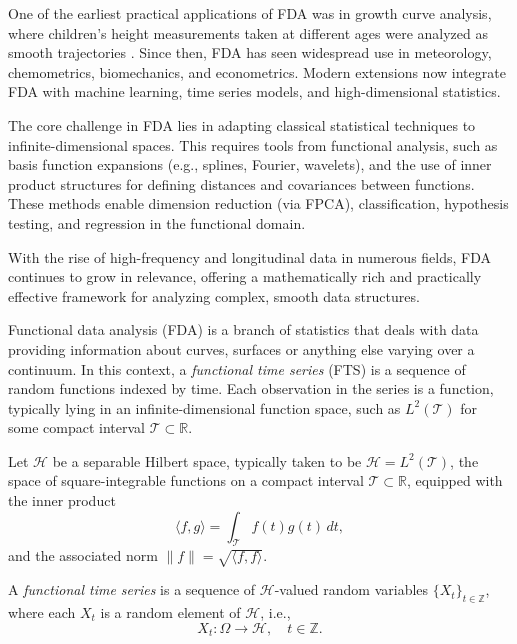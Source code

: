\documentclass[article]{abntex2}
\begin{document}
One of the earliest practical applications of FDA was in growth curve analysis, where children’s height measurements taken at different ages were analyzed as smooth trajectories . Since then, FDA has seen widespread use in meteorology, chemometrics, biomechanics, and econometrics. Modern extensions now integrate FDA with machine learning, time series models, and high-dimensional statistics.

The core challenge in FDA lies in adapting classical statistical techniques to infinite-dimensional spaces. This requires tools from functional analysis, such as basis function expansions (e.g., splines, Fourier, wavelets), and the use of inner product structures for defining distances and covariances between functions. These methods enable dimension reduction (via FPCA), classification, hypothesis testing, and regression in the functional domain.

With the rise of high-frequency and longitudinal data in numerous fields, FDA continues to grow in relevance, offering a mathematically rich and practically effective framework for analyzing complex, smooth data structures.




Functional data analysis (FDA) is a branch of statistics that deals with data providing information about curves, surfaces or anything else varying over a continuum. In this context, a \emph{functional time series} (FTS) is a sequence of random functions indexed by time. Each observation in the series is a function, typically lying in an infinite-dimensional function space, such as $L^2(\mathcal{T})$ for some compact interval $\mathcal{T} \subset \mathbb{R}$.

Let $\mathcal{H}$ be a separable Hilbert space, typically taken to be $\mathcal{H} = L^2(\mathcal{T})$, the space of square-integrable functions on a compact interval $\mathcal{T} \subset \mathbb{R}$, equipped with the inner product
\[
\langle f, g \rangle = \int_{\mathcal{T}} f(t) g(t) \, dt,
\]
and the associated norm $\|f\| = \sqrt{\langle f, f \rangle}$.

A \emph{functional time series} is a sequence of $\mathcal{H}$-valued random variables $\{X_t\}_{t \in \mathbb{Z}}$, where each $X_t$ is a random element of $\mathcal{H}$, i.e.,
\[
X_t : \Omega \to \mathcal{H}, \quad t \in \mathbb{Z}.
\]
\end{document}
